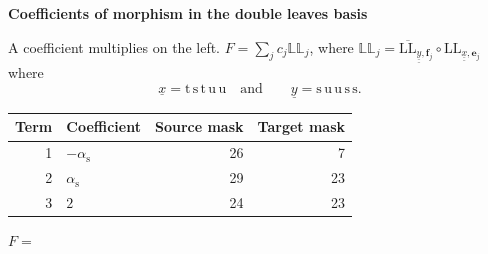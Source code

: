 \documentclass[10pt,a4paper]{article}
\begin{document}
{\Large\bfseries Coefficients of morphism in the double leaves basis}\par
A coefficient multiplies on the left. 
\(F=\sum_j c_j \mathbb{L}\mathbb{L}_j\), where \(\mathbb{L}\mathbb{L}_j=\overline{\mathrm{LL}}_{\underline{\underline{y}},\mathbf{f}_j} \circ\mathrm{LL}_{\underline{\underline{x}},\mathbf{e}_j}\) where
\[\underline{x}=\text{t}\,\text{s}\,\text{t}\,\text{u}\,\text{u}\quad\text{and}\qquad \underline{y}=\text{s}\,\text{u}\,\text{u}\,\text{s}\,\text{s}.\]\par
\begin{longtable}{r p{.46\linewidth} r r}
\toprule Term & Coefficient & Source mask & Target mask \\ \midrule\endhead
1 & $-\alpha_{\text{s}}$ & 26 & 7 \\
2 & $\alpha_{\text{s}}$ & 29 & 23 \\
3 & $2$ & 24 & 23 \\
\bottomrule\end{longtable}
\clearpage
$F = $\par
\end{document}
